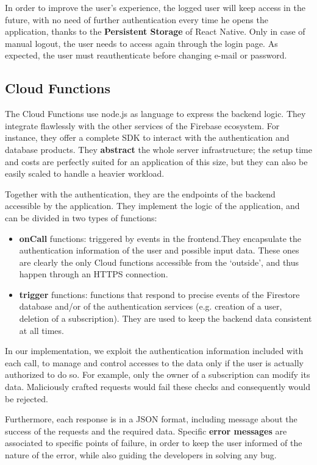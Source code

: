 \documentclass[12pt]{article}
\begin{document}
In order to improve the user's experience, the logged user will keep access in the future, with no need of further authentication every time he opens the application, thanks to the \textbf{Persistent Storage} of React Native. Only in case of manual logout, the user needs to access again through the login page. As expected, the user must reauthenticate before changing e-mail or password.

\subsection{Cloud Functions}
The Cloud Functions use node.js as language to express the backend logic.
They integrate flawlessly with the other services of the Firebase ecosystem. For instance, they offer a complete SDK to interact with the authentication and database products. They \textbf{abstract} the whole server infrastructure; the setup time and costs are perfectly suited for an application of this size, but they can also be easily scaled to handle a heavier workload.

Together with the authentication, they are the endpoints of the backend accessible by the application. They implement the logic of the application, and can be divided in two types of functions: \begin{itemize}
    \item \textbf{onCall} functions: triggered by events in the frontend.They encapsulate the authentication information of the user and possible input data. These ones are clearly the only Cloud functions accessible from the `outside', and thus happen through an HTTPS connection.
    \item \textbf{trigger} functions: functions that respond to precise events of the Firestore database and/or of the authentication services (e.g. creation of a user, deletion of a subscription). They are used to keep the backend data consistent at all times.
\end{itemize}

In our implementation, we exploit the authentication information included with each call, to manage and control accesses to the data only if the user is actually authorized to do so. For example, only the owner of a subscription can modify its data. Maliciously crafted requests would fail these checks and consequently would be rejected.

Furthermore, each response is in a JSON format, including message about the success of the requests and the required data. Specific \textbf{error messages} are associated to specific points of failure, in order to keep the user informed of the nature of the error, while also guiding the developers in solving any bug.
\end{document}

